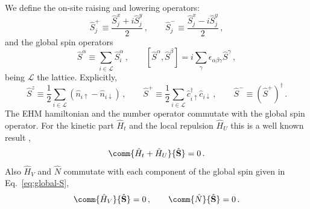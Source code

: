 We define the on-site raising and lowering operators:
\begin{equation}\label{eq:local-S+/-}
	\hat S_j^+ \equiv \frac{\hat S_j^x + i\hat S_j^y}{2} \, ,
	\qquad
	\hat S_j^- \equiv \frac{\hat S_j^x - i\hat S_j^y}{2} \, ,
\end{equation}
and the global spin operators
\begin{equation}\label{eq:global-S}
	\hat S^\alpha \equiv \sum_{i \in \mathcal{L}} \hat S_i^\alpha \, ,
	\qquad
	\left[ \hat S^\alpha, \hat S^\beta \right] = i \sum_\gamma \epsilon_{\alpha\beta\gamma} \hat S^\gamma \, ,
\end{equation}
being $\mathcal{L}$ the lattice. Explicitly,
\[
	\hat S^z \equiv \frac{1}{2} \sum_{i \in \mathcal{L}} \left(
		\hat n_{i\uparrow} - \hat n_{i\downarrow}
	\right) \, ,
	\qquad
	\hat S^+ \equiv \frac{1}{2} \sum_{i \in \mathcal{L}} \hat c_{i\uparrow}^\dagger \hat c_{i\downarrow} \, ,
	\qquad
	\hat S^- \equiv \left( \hat S^+ \right)^\dagger \, .
\]
The EHM hamiltonian and the number operator commutate with the global spin operator. For the kinetic part $\hat H_t$ and the local repulsion $\hat H_U$ this is a well known result \cite{arovas2022hubbard,pavarini2015many},
\[
	\comm{\hat H_t + \hat H_U}{\hat{\mathbf{S}}} = 0 \, .
\]
Also $\hat H_V$ and $\hat N$ commutate with each component of the global spin given in Eq.~\eqref{eq:global-S},
\begin{equation}\label{eq:[HV,S]=0-[N,S]=0}
	\comm{\hat H_V}{\hat{\mathbf{S}}} = 0 \, ,
	\qquad
	\comm{\hat N}{\hat{\mathbf{S}}} = 0 \, .
\end{equation}

